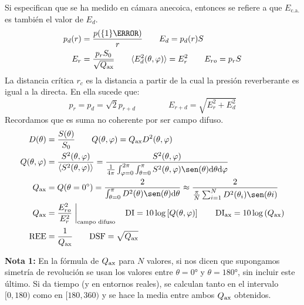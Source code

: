 \documentclass[a4paper, 8pt]{extarticle}
\renewcommand{\sin}{\sen}
\begin{document}
\begin{multicols}{3}
  Si especifican que se ha medido en cámara anecoica, entonces se refiere a que $E_{\text{c.a.}}$ es también el valor de $E_d$.
  \begin{align*}
    p_d (r) & = \frac{p (\qty{1}{\metre } )}{r} \qquad E_d = p_d (r) S                                                                  \\
    E_r     & = \frac{p_r S_0}{\sqrt{Q _{\textnormal{ax}}}} \qquad \langle E_d^2(\theta, \varphi) \rangle = E_r^2 \qquad E_{ro} = p_r S
  \end{align*}
  La distancia crítica $r_c$ es la distancia a partir de la cual la presión reverberante es igual a la directa. En ella sucede que:
  \[ p_r = p_d = \sqrt{2} p_{r+d} \qquad\qquad E_{r+d}  = \sqrt{E_r ^2 + E_d ^2} \]
  Recordamos que es suma no coherente por ser campo difuso.
  \begin{align*}
    D( \theta)          & = \frac{S(\theta)}{S_0 } \qquad Q(\theta, \varphi ) = Q _{\textnormal{ax}} D^2                                                    (\theta, \varphi )                                                                              \\
    Q(\theta, \varphi ) & = \frac{S^2(\theta, \varphi )}{\langle S^2(\theta, \varphi) \rangle} = \frac{S^2(\theta, \varphi )}{\frac{1}{4\pi} \int_{\varphi = 0}^{2\pi} \int_{\theta = 0}^{\pi} S^2(\theta, \varphi) \sin (\theta ) \dd \theta \dd \varphi } \\
    Q_{\textnormal{ax}} & = Q(\theta = \ang{0}) = \frac{2}{\int_{\theta = 0}^{\pi} D^2(\theta) \sin (\theta ) \dd \theta } \approx \frac{2}{\frac{\pi}{N} \sum _{i=1}^{N} D^2(\theta _i) \sin (\theta i)}                                                   \\
    Q_{\textnormal{ax}} & = \frac{E^2_{ro}} {E^2_r} \eval*{}_{\text{campo difuso}} \quad \text{DI} = 10 \log \left[ Q( \theta, \varphi) \right] \qquad \text{DI} _{\textnormal{ax}} = 10 \log \left( Q_{\textnormal{ax}} \right)                            \\
    \text{REE}          & = \frac{1}{Q_ {\textnormal{ax}}} \qquad \text{DSF} = \sqrt{Q_{\textnormal{ax}}}                                                                                                                                                   \\
  \end{align*}

  \textbf{Nota 1:} En la fórmula de $Q_{\textnormal{ax}}$ para $N$ valores, si nos dicen que supongamos simetría de revolución se usan los valores entre $\theta = \ang{0}$ y $\theta = \ang{180}$, sin incluir este último. Si da tiempo (y en entornos reales), se calculan tanto en el intervalo $[0, 180)$ como en $[180, 360)$ y se hace la media entre ambos $Q_{\textnormal{ax}}$ obtenidos.


\end{multicols}
\end{document}
